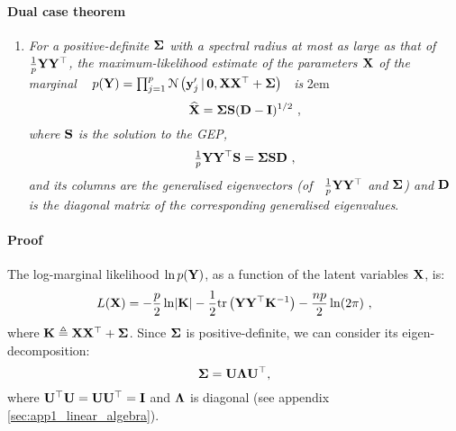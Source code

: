       \paragraph{Dual case theorem}
      \begin{enumerate}
	\item[] \textit{ For a positive-definite $\mathbf{\Sigma}$ with a spectral radius at most as large as that
	of ~$\tfrac{1}{p} \mathbf{Y} \mathbf{Y}^\top$,
	the maximum-likelihood estimate of the parameters $\mathbf{X}$ of the marginal ~
	$p(\mathbf{Y}) = \prod_{j=1}^p \mathcal{N} \left(  \mathbf{y}^{\prime}_j \,|\, \mathbf{0} ,  \mathbf{X}\mathbf{X}^\top + \mathbf{\Sigma} \right)$~ is}
	\rightskip2em
	\begin{equation} \label{equ:chap3_theorem}
	  \widehat{\mathbf{X}} = \mathbf{\Sigma} \mathbf{S} ( \mathbf{D} - \mathbf{I} )^{1/2} ~,
	\end{equation}
	\textit{where $\mathbf{S}$ is the solution to the GEP,}
	\begin{equation} \label{equ:chap3_GEP}
	  \tfrac{1}{p} \mathbf{Y} \mathbf{Y}^\top \mathbf{S} = \mathbf{\Sigma} \mathbf{S} \mathbf{D}~,
	\end{equation}
	\textit{and its columns are the \textit{generalised eigenvectors} (of ~$\tfrac{1}{p} \mathbf{Y} \mathbf{Y}^\top$
	and $\mathbf{\Sigma}$) and $\mathbf{D}$ is the diagonal matrix of the corresponding generalised eigenvalues}.
      \end{enumerate}

      \paragraph{Proof} %
      The log-marginal likelihood $\ln p(\mathbf{Y})$, as a function of the latent variables $\mathbf{X}$, is:
      \begin{align*} \label{equ:chap3_logmarginalY}
        L(\mathbf{X}) = -\frac{p}{2} \ln \lvert \mathbf{K} \rvert - \frac{1}{2}\mathrm{tr}\left(\mathbf{Y}\mathbf{Y}^\top \mathbf{K}^{-1}\right) - \frac{np}{2}\ln(2\pi) ~,
      \end{align*}
      where $\mathbf{K} \triangleq \mathbf{X}\mathbf{X}^\top + \mathbf{\Sigma}$. Since $\mathbf{\Sigma}$ is positive-definite, we can consider its eigen-decomposition:
      \begin{equation} \label{equ:chap3_sigmadecomp}
	\mathbf{\Sigma} = \mathbf{U} \mathbf{\Lambda} \mathbf{U}^\top,
      \end{equation}
      where $\mathbf{U}^\top \mathbf{U} = \mathbf{U} \mathbf{U}^\top = \mathbf{I}$ and $\mathbf{\Lambda}$ is diagonal (see appendix \ref{sec:app1_linear_algebra}).

